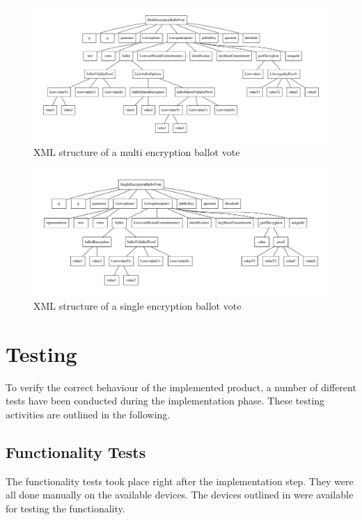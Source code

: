 \documentclass[numbers=noenddot, abstract=on, a4paper, headsepline,
footsepline, oneside, openright, draft=off, listof=leveldown]{scrreprt}
\begin{document}
\begin{figure}[htbp]	
	\includegraphics[width=\textwidth]{xmlstructuremulti.pdf}
	\caption{XML structure of a multi encryption ballot vote}
	\label{fig:xmlstructuremulti}
\end{figure}

\begin{figure}[htbp]	
	\includegraphics[width=\textwidth]{xmlstructuresingle.pdf}
	\caption{XML structure of a single encryption ballot vote}
	\label{fig:xmlstructuresingle}
\end{figure}



\section{Testing}
\label{sec:testing}
To verify the correct behaviour of the implemented product, a number of
different tests have been conducted during the implementation phase. These
testing activities are outlined in the following.

\subsection{Functionality Tests}
\label{sec:functionalitytests}
The functionality tests took place right after the implementation
step. They were all done manually on the available devices. The
devices outlined in  were available for testing the
functionality.
\end{document}
